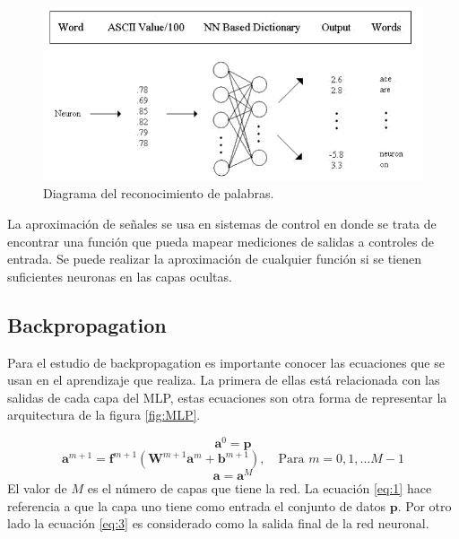\begin{figure}[H]
    \begin{center}
        \includegraphics[width=12cm]{img/palabras.png}
        \caption{Diagrama del reconocimiento de palabras. \cite{pdf}}
        \label{fig:palabras}
    \end{center}
\end{figure}

La aproximación de señales se usa en sistemas de control en donde se trata de encontrar una función que pueda mapear mediciones de salidas a controles de entrada. Se puede realizar la aproximación de cualquier función si se tienen suficientes neuronas en las capas ocultas. 
\subsection{Backpropagation}
Para el estudio de backpropagation es importante conocer las ecuaciones que se usan en el aprendizaje que realiza. La primera de ellas está relacionada con las salidas de cada capa del MLP, estas ecuaciones son otra forma de representar la arquitectura de la figura \ref{fig:MLP}.

\begin{equation} \label{eq:1}
\boldsymbol{a}^0 = \boldsymbol{p}
\end{equation}
\begin{equation} \label{eq:2}
\boldsymbol{a}^{m+1} = \boldsymbol{f}^{m+1}(\boldsymbol{W}^{m+1}\boldsymbol{a}^{m}+\boldsymbol{b}^{m+1}
), \quad \text{Para $m=0, 1, \ldots M-1$}
\end{equation}
\begin{equation} \label{eq:3}
    \boldsymbol{a} = \boldsymbol{a}^{M}
\end{equation}
El valor de $M$ es el número de capas que tiene la red. La ecuación \ref{eq:1} hace referencia a que la capa uno tiene como entrada el conjunto de datos $\boldsymbol{p}$. Por otro lado la ecuación \ref{eq:3} es considerado como la salida final de la red neuronal.


